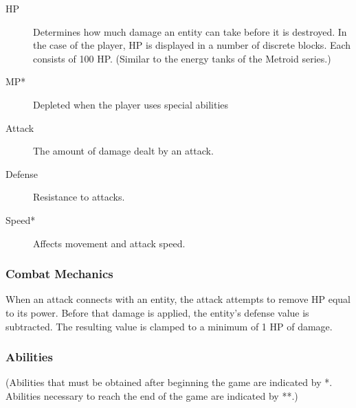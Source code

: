 \documentclass{article}
\begin{document}
\begin{description}

\item[HP]
Determines how much damage an entity can take before it is destroyed.  In the case of the player, HP is displayed in a number of discrete blocks.  Each consists of 100 HP.  (Similar to the energy tanks of the Metroid series.)

\item[MP*]
Depleted when the player uses special abilities

\item[Attack]
The amount of damage dealt by an attack.

\item[Defense]
Resistance to attacks.

\item[Speed*]
Affects movement and attack speed.

\end{description}

\label{CombatMechanics}
\subsubsection{Combat Mechanics}

When an attack connects with an entity, the attack attempts to remove HP equal to its power.  Before that damage is applied, the entity's defense value is subtracted.  The resulting value is clamped to a minimum of 1 HP of damage.


\subsubsection{Abilities}
(Abilities that must be obtained after beginning the game are indicated by *.  Abilities necessary to reach the end of the game are indicated by **.)
\end{document}
